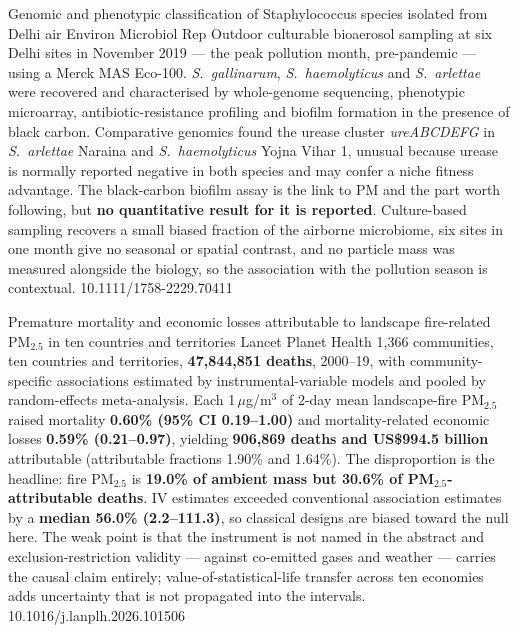\documentclass[10pt]{article}
\begin{document}
{Genomic and phenotypic classification of Staphylococcus species isolated from Delhi air}
{Environ Microbiol Rep}
{Outdoor culturable bioaerosol sampling at six Delhi sites in November 2019 --- the peak
pollution month, pre-pandemic --- using a Merck MAS Eco-100. \textit{S.\ gallinarum},
\textit{S.\ haemolyticus} and \textit{S.\ arlettae} were recovered and characterised by
whole-genome sequencing, phenotypic microarray, antibiotic-resistance profiling and biofilm
formation in the presence of black carbon. Comparative genomics found the urease cluster
\textit{ureABCDEFG} in \textit{S.\ arlettae} Naraina and \textit{S.\ haemolyticus} Yojna
Vihar 1, unusual because urease is normally reported negative in both species and may
confer a niche fitness advantage. The black-carbon biofilm assay is the link to PM and the
part worth following, but \textbf{no quantitative result for it is reported}. Culture-based
sampling recovers a small biased fraction of the airborne microbiome, six sites in one
month give no seasonal or spatial contrast, and no particle mass was measured alongside
the biology, so the association with the pollution season is contextual.}
{10.1111/1758-2229.70411}



{Premature mortality and economic losses attributable to landscape fire-related PM$_{2.5}$ in ten countries and territories}
{Lancet Planet Health}
{1{,}366 communities, ten countries and territories, \textbf{47{,}844{,}851 deaths},
2000--19, with community-specific associations estimated by instrumental-variable models
and pooled by random-effects meta-analysis. Each 1\,$\mu$g/m$^3$ of 2-day mean
landscape-fire PM$_{2.5}$ raised mortality \textbf{0.60\% (95\% CI 0.19--1.00)} and
mortality-related economic losses \textbf{0.59\% (0.21--0.97)}, yielding
\textbf{906{,}869 deaths and US\$994.5 billion} attributable (attributable fractions 1.90\%
and 1.64\%). The disproportion is the headline: fire PM$_{2.5}$ is \textbf{19.0\% of
ambient mass but 30.6\% of PM$_{2.5}$-attributable deaths}. IV estimates exceeded
conventional association estimates by a \textbf{median 56.0\% (2.2--111.3)}, so classical
designs are biased toward the null here. The weak point is that the instrument is not
named in the abstract and exclusion-restriction validity --- against co-emitted gases and
weather --- carries the causal claim entirely; value-of-statistical-life transfer across
ten economies adds uncertainty that is not propagated into the intervals.}
{10.1016/j.lanplh.2026.101506}
\end{document}
